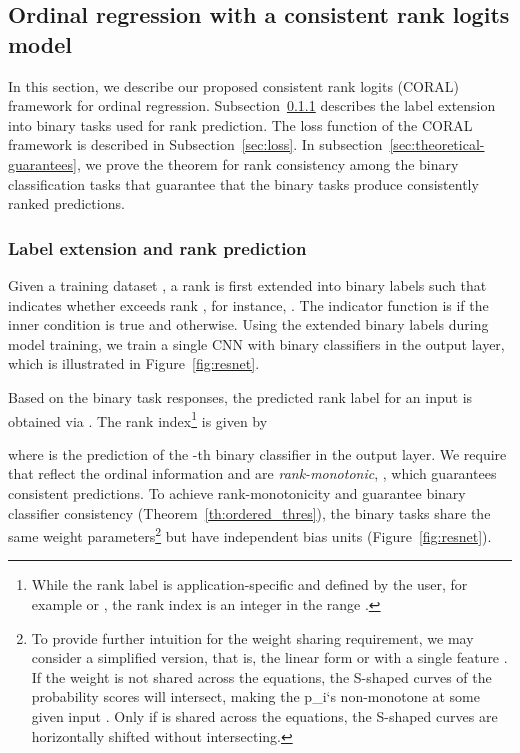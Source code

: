 \documentclass[times,twocolumn,final,authoryear]{elsarticle}
\begin{document}
\subsection{Ordinal regression with a consistent rank logits model}
 
In this section, we describe our proposed consistent rank logits (CORAL) framework for ordinal regression. Subsection~\ref{sec:label-extension} describes the label extension into binary tasks used for rank prediction. The loss function of the CORAL framework is described in Subsection~\ref{sec:loss}. In subsection~\ref{sec:theoretical-guarantees}, we prove the theorem for rank consistency among the binary classification tasks that guarantee that the binary tasks produce consistently ranked predictions. 


\subsubsection{Label extension and rank prediction} 
\label{sec:label-extension}

Given a training dataset , a rank   is first extended into  binary labels  such that  indicates whether  exceeds rank , for instance, . The indicator function  is  if the inner condition is true and  otherwise. Using the extended binary labels during model training, we train a single CNN with  binary classifiers in the output layer, which is illustrated in Figure~\ref{fig:resnet}. 

Based on the binary task responses, the predicted rank label for an input  is obtained via . The rank index\footnote{While the rank label  is application-specific and defined by the user, for example {} or {}, the rank index  is an integer in the range .}  is given by

where  is the prediction of the -th binary classifier in the output layer. We require that  reflect the ordinal information and are  \emph{rank-monotonic}, , which guarantees consistent predictions. To achieve rank-monotonicity and guarantee binary classifier consistency (Theorem~\ref{th:ordered_thres}), the  binary tasks share the same weight parameters\footnote{To provide further intuition for the weight sharing requirement, we may consider a simplified version, that is, the linear form  or  with a single feature . If the weight  is not shared across the  equations, the S-shaped curves of the probability scores  will intersect, making the p_i`s non-monotone at some given input . Only if  is shared across the  equations, the S-shaped curves are horizontally shifted without intersecting.} but have independent bias units (Figure~\ref{fig:resnet}).
\end{document}
